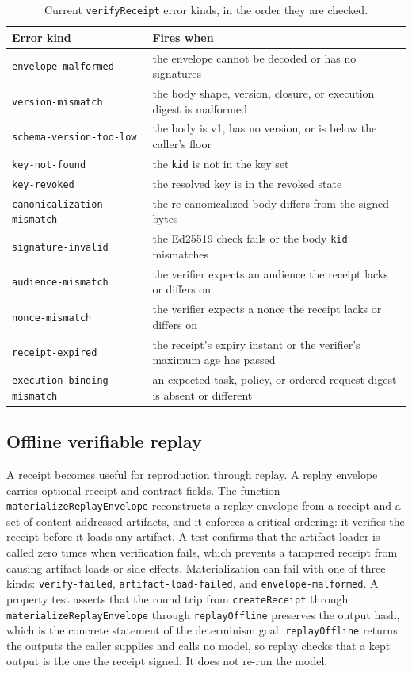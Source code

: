 \documentclass[conference]{IEEEtran}
\newcommand{\code}[1]{\texttt{\small #1}}
\begin{document}
\begin{table}[t]
\centering
\caption{Current \code{verifyReceipt} error kinds, in the order they are checked.}
\label{tab:verify}
\scriptsize
\begin{tabular}{@{}l >{\raggedright\arraybackslash}p{}@{}}
\toprule
Error kind & Fires when \\
\midrule
\code{envelope-malformed} & the envelope cannot be decoded or has no signatures \\
\code{version-mismatch} & the body shape, version, closure, or execution digest is malformed \\
\code{schema-version-too-low} & the body is v1, has no version, or is below the caller's floor \\
\code{key-not-found} & the \code{kid} is not in the key set \\
\code{key-revoked} & the resolved key is in the revoked state \\
\code{canonicalization-mismatch} & the re-canonicalized body differs from the signed bytes \\
\code{signature-invalid} & the Ed25519 check fails or the body \code{kid} mismatches \\
\code{audience-mismatch} & the verifier expects an audience the receipt lacks or differs on \\
\code{nonce-mismatch} & the verifier expects a nonce the receipt lacks or differs on \\
\code{receipt-expired} & the receipt's expiry instant or the verifier's maximum age has passed \\
\code{execution-binding-mismatch} & an expected task, policy, or ordered request digest is absent or different \\
\bottomrule
\end{tabular}
\end{table}

\subsection{Offline verifiable replay}

A receipt becomes useful for reproduction through replay. A replay envelope carries
optional receipt and contract fields. The function \code{materializeReplayEnvelope}
reconstructs a replay envelope from a receipt and a set of content-addressed
artifacts, and it enforces a critical ordering: it verifies the receipt before it
loads any artifact. A test confirms that the artifact loader is called zero times when
verification fails, which prevents a tampered receipt from causing artifact loads or
side effects. Materialization can fail with one of three kinds:
\code{verify-failed}, \code{artifact-load-failed}, and \code{envelope-malformed}. A
property test asserts that the round trip from \code{createReceipt} through
\code{materializeReplayEnvelope} through \code{replayOffline} preserves the output
hash, which is the concrete statement of the determinism goal. \code{replayOffline}
returns the outputs the caller supplies and calls no model, so replay checks that a kept
output is the one the receipt signed. It does not re-run the model.
\end{document}
